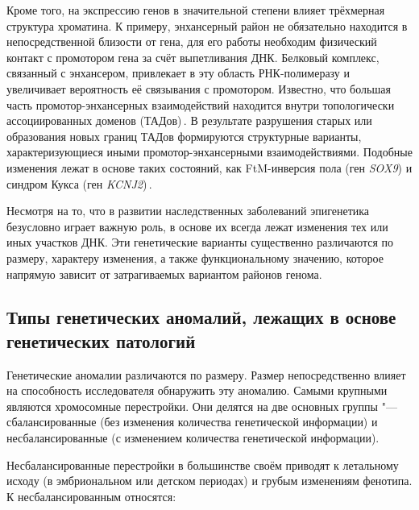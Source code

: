 \documentclass[a4paper,14pt]{extarticle}
\newcommand{\genename}[1]{\textit{#1}}
\newcommand{\ecitep}[1]{\textenglish{\citep{#1}}}
\begin{document}
Кроме того, на экспрессию генов в значительной степени влияет трёхмерная структура хроматина.
К примеру, энхансерный район не обязательно находится в непосредственной близости от гена, для его работы необходим физический контакт с промотором гена за счёт выпетливания ДНК.
Белковый комплекс, связанный с энхансером, привлекает в эту область РНК-полимеразу и увеличивает вероятность её связывания с промотором.
Известно, что большая часть промотор-энхансерных взаимодействий находится внутри топологически ассоциированных доменов (ТАДов)\,\ecitep{Rao_2014}.
В результате разрушения старых или образования новых границ ТАДов формируются структурные варианты, характеризующиеся иными промотор-энхансерными взаимодействиями.
Подобные изменения лежат в основе таких состояний, как FtM-инверсия пола (ген \genename{SOX9}) и синдром Кукса (ген \genename{KCNJ2})\,\ecitep{Spielmann_2018}.

Несмотря на то, что в развитии наследственных заболеваний эпигенетика безусловно играет важную роль, в основе их всегда лежат изменения тех или иных участков ДНК.
Эти генетические варианты существенно различаются по размеру, характеру изменения, а также функциональному значению, которое напрямую зависит от затрагиваемых вариантом районов генома.

\subsection{Типы генетических аномалий, лежащих в основе генетических патологий}

Генетические аномалии различаются по размеру.
Размер непосредственно влияет на способность исследователя обнаружить эту аномалию.
Самыми крупными являются хромосомные перестройки.
Они делятся на две основных группы "--- сбалансированные (без изменения количества генетической информации) и несбалансированные (с изменением количества генетической информации).

Несбалансированные перестройки в большинстве своём приводят к летальному исходу (в эмбриональном или детском периодах) и грубым изменениям фенотипа.
К несбалансированным относятся:
\end{document}
